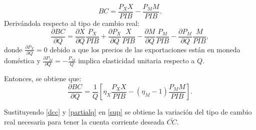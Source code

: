 \documentclass[12pt,letterpaper]{article}
\begin{document}
\begin{equation}
BC=\frac{P_X X}{PIB}-\frac{P_M M}{PIB}.
\end{equation}
Derivándola respecto al tipo de cambio real:
\begin{equation}
\frac{\partial BC}{\partial Q}=\frac{\partial X}{\partial Q} \frac{P_X}{PIB}+\frac{\partial P_X}{\partial Q} \frac{X}{PIB} - \frac{\partial M}{\partial Q} \frac{P_M}{PIB}-\frac{\partial P_M}{\partial Q}\frac{M}{PIB},
\end{equation}
donde $\frac{\partial P_X}{\partial Q}=0$ debido a que los precios de las exportaciones están en moneda doméstica y $\frac{\partial P_M}{\partial Q}=-\frac{P_M}{Q}$ implica elasticidad unitaria respecto a $Q$.

Entonces, se obtiene que:
\begin{equation}\label{partialq}
\frac{\partial BC}{\partial Q}=\frac{1}{Q} \left[\eta_X \frac{P_X X}{PIB}-(\eta_M -1)\frac{P_M M}{PIB}\right].
\end{equation}

Sustituyendo \ref{dcc} y \ref{partialq} en \ref{sup} se obtiene la variación del tipo de cambio real necesaria para tener la cuenta corriente deseada $\bar{CC}$.

\end{document}
